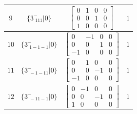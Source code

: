 \documentclass[fleqn,8pt]{jsarticle}
\begin{document}
\begin{longtable}{cccc}
$ 9 $ & $ \{3^{-}_{\,\,111}|0\} $ & $ \begin{bmatrix} 0 & 1 & 0 & 0 \\ 0 & 0 & 1 & 0 \\ 1 & 0 & 0 & 0 \end{bmatrix} $ & $ 1 $ \\ \hline
$ 10 $ & $ \{3^{-}_{\,\,1-1-1}|0\} $ & $ \begin{bmatrix} 0 & -1 & 0 & 0 \\ 0 & 0 & 1 & 0 \\ -1 & 0 & 0 & 0 \end{bmatrix} $ & $ 1 $ \\ \hline
$ 11 $ & $ \{3^{-}_{\,\,-1-11}|0\} $ & $ \begin{bmatrix} 0 & 1 & 0 & 0 \\ 0 & 0 & -1 & 0 \\ -1 & 0 & 0 & 0 \end{bmatrix} $ & $ 1 $ \\ \hline
$ 12 $ & $ \{3^{-}_{\,\,-11-1}|0\} $ & $ \begin{bmatrix} 0 & -1 & 0 & 0 \\ 0 & 0 & -1 & 0 \\ 1 & 0 & 0 & 0 \end{bmatrix} $ & $ 1 $ \\
\end{longtable}
\end{document}
